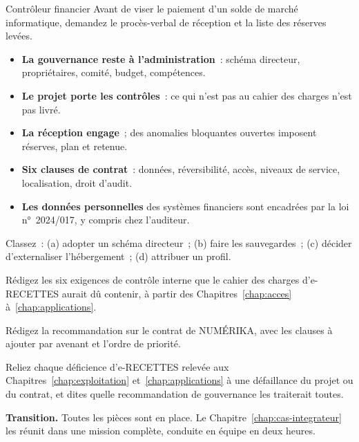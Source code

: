 \begin{boxmetier}{Contrôleur financier}
Avant de viser le paiement d'un solde de marché informatique, demandez le
procès-verbal de réception et la liste des réserves levées.
\end{boxmetier}

\separateur

\begin{boxresume}
\begin{itemize}
    \item \textbf{La gouvernance reste à l'administration}~: schéma
          directeur, propriétaires, comité, budget, compétences.
    \item \textbf{Le projet porte les contrôles}~: ce qui n'est pas au
          cahier des charges n'est pas livré.
    \item \textbf{La réception engage}~; des anomalies bloquantes ouvertes
          imposent réserves, plan et retenue.
    \item \textbf{Six clauses de contrat}~: données, réversibilité, accès,
          niveaux de service, localisation, droit d'audit.
    \item \textbf{Les données personnelles} des systèmes financiers sont
          encadrées par la loi n°~2024/017, y compris chez l'auditeur.
\end{itemize}
\end{boxresume}

\begin{boxexo}[title={\ding{45}\quad Exercice~13.1. Gouvernance ou gestion~? \niveaubase}]
Classez~: (a) adopter un schéma directeur~; (b) faire les sauvegardes~;
(c) décider d'externaliser l'hébergement~; (d) attribuer un profil.
\end{boxexo}

\begin{boxexo}[title={\ding{45}\quad Exercice~13.2. Un cahier des charges \niveaumoyen}]
Rédigez les six exigences de contrôle interne que le cahier des charges
d'e-RECETTES aurait dû contenir, à partir des
Chapitres~\ref{chap:acces} à~\ref{chap:applications}.
\end{boxexo}

\begin{boxexo}[title={\ding{45}\quad Exercice~13.3. Le contrat \niveaumoyen}]
Rédigez la recommandation sur le contrat de NUMÉRIKA, avec les clauses à
ajouter par avenant et l'ordre de priorité.
\end{boxexo}

\begin{boxexo}[title={\ding{45}\quad Exercice~13.4. Les causes \niveauexpert}]
Reliez chaque déficience d'e-RECETTES relevée aux Chapitres~\ref{chap:exploitation}
et~\ref{chap:applications} à une défaillance du projet ou du contrat, et
dites quelle recommandation de gouvernance les traiterait toutes.
\end{boxexo}

\begin{boxinfo}
\textbf{Transition.} Toutes les pièces sont en place. Le
Chapitre~\ref{chap:cas-integrateur} les réunit dans une mission
complète, conduite en équipe en deux heures.
\end{boxinfo}
